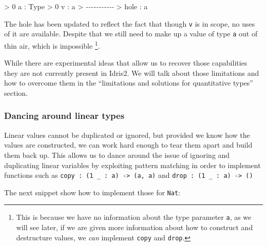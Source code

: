 \documentclass[
]{article}
\newenvironment{Shaded}{}{}
\newcommand{\CommentTok}[1]{\textcolor[rgb]{0.38,0.63,0.69}{\textit{#1}}}
\newcommand{\DataTypeTok}[1]{\textcolor[rgb]{0.56,0.13,0.00}{#1}}
\newcommand{\DecValTok}[1]{\textcolor[rgb]{0.25,0.63,0.44}{#1}}
\newcommand{\NormalTok}[1]{#1}
\newcommand{\OperatorTok}[1]{\textcolor[rgb]{0.40,0.40,0.40}{#1}}
\begin{document}
\begin{Shaded}
\begin{Highlighting}[]
\OperatorTok{\textgreater{}} \DecValTok{0}\NormalTok{ a }\OperatorTok{:} \DataTypeTok{Type}
\OperatorTok{\textgreater{}} \DecValTok{0}\NormalTok{ v }\OperatorTok{:}\NormalTok{ a}
\OperatorTok{\textgreater{}} \CommentTok{{-}{-}{-}{-}{-}{-}{-}{-}{-}{-}{-}}
\OperatorTok{\textgreater{}}\NormalTok{ hole }\OperatorTok{:}\NormalTok{ a}
\end{Highlighting}
\end{Shaded}

The hole has been updated to reflect the fact that though \texttt{v} is
in scope, no uses of it are available. Despite that we still need to
make up a value of type \texttt{a} out of thin air, which is impossible
\footnote{This is because we have no information about the type
  parameter \texttt{a}, as we will see later, if we are given more
  information about how to construct and destructure values, we
  \emph{can} implement \texttt{copy} and \texttt{drop}.}.

While there are experimental ideas that allow us to recover those
capabilities they are not currently present in Idris2. We will talk
about those limitations and how to overcome them in the ``limitations
and solutions for quantitative types'' section.

\hypertarget{dancing-around-linear-types}{%
\subsubsection{Dancing around linear
types}\label{dancing-around-linear-types}}

Linear values cannot be duplicated or ignored, but provided we know how
the values are constructed, we can work hard enough to tear them apart
and build them back up. This allows us to dance around the issue of
ignoring and duplicating linear variables by exploiting pattern matching
in order to implement functions such as
\texttt{copy\ :\ (1\ \_\ :\ a)\ \textasciigrave{}-\textgreater{}\ (a,\ a)}
and \texttt{drop\ :\ (1\ \_\ :\ a)\ -\textgreater{}\ ()}

The next snippet show how to implement those for \texttt{Nat}:
\end{document}
